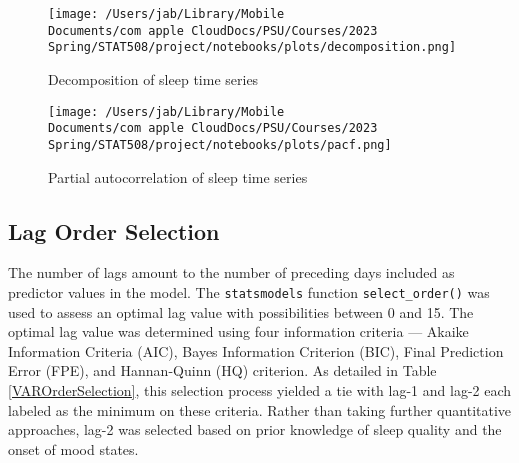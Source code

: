 \documentclass{article}
\begin{document}
\begin{figure}[hb]
\centering
  \texttt{[image: /Users/jab/Library/Mobile Documents/com~apple~CloudDocs/PSU/Courses/2023 Spring/STAT508/project/notebooks/plots/decomposition.png]}
\caption{Decomposition of sleep time series}
\label{Decomposition}
\end{figure}

\begin{figure}[hb]
\centering
  \texttt{[image: /Users/jab/Library/Mobile Documents/com~apple~CloudDocs/PSU/Courses/2023 Spring/STAT508/project/notebooks/plots/pacf.png]}
\caption{Partial autocorrelation of sleep time series}
\label{PACF}
\end{figure}

\hypertarget{lag-order-selection}{%
\subsection{Lag Order Selection}\label{lag-order-selection}}

The number of lags amount to the number of preceding days included as predictor
values in the model. The \texttt{statsmodels} function \texttt{select\_order()} was
used to assess an optimal lag value with possibilities between 0 and 15. The
optimal lag value was determined using four information criteria --- Akaike
Information Criteria (AIC), Bayes Information Criterion (BIC), Final Prediction
Error (FPE), and Hannan-Quinn (HQ) criterion. As detailed in Table
\ref{VAROrderSelection}, this selection process yielded a tie with lag-1 and
lag-2 each labeled as the minimum on these criteria. Rather than taking further
quantitative approaches, lag-2 was selected based on prior knowledge of sleep
quality and the onset of mood states.
\end{document}
